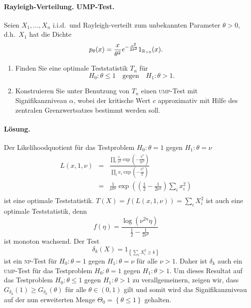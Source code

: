 






\paragraph{Rayleigh-Verteilung. UMP-Test.} Seien $X_1,\ldots,X_n$ i.i.d.\ und Rayleigh-verteilt
zum unbekannten Parameter $\theta>0$, d.h.\ $X_1$ hat die Dichte 
\begin{equation*}
    p_\theta(x) = \frac{x}{\theta^2} e^{- \frac{x^2}{2\theta^2}} 1_{\mathbb R_{>0}}(x).
\end{equation*}
\begin{enumerate}
    \item Finden Sie eine optimale Teststatistik $T_n$ für
        \begin{equation*}
            H_0 : \theta\leq 1 \quad \textrm{gegen} \quad H_1 : \theta >1.
        \end{equation*}
    \item Konstruieren Sie unter Benutzung von $T_n$ einen \textsc{ump}-Test mit Signifikanzniveau 
        $\alpha$, wobei der kritische Wert $c$ approximativ mit Hilfe des zentralen Grenzwertsatzes
        bestimmt werden soll.
\end{enumerate}

\paragraph*{Lösung. } Der Likelihoodquotient für das Testproblem $H_0: \theta=1$ gegen $H_1 : \theta=\nu$
\begin{eqnarray*}
    L(x,1,\nu) &=& 
    \frac{\prod_i \frac{x_i}{\nu^2} \exp \left( -\frac{x_i^2}{2 \nu^2} \right)}{ \prod_i x_i \exp \left( - \frac{x_i^2}{2} \right)  } \\
    &=& \frac{1}{ \nu^{2n}} \exp\left( \left( \frac{1}{2} -\frac{1}{2 \nu^2} \right) \sum_{i}^{} x_i^2 \right)\\
\end{eqnarray*}
ist eine optimale Teststatistik. $T(X)=f(L(x,1,\nu))= \sum_{i}^{} X_i^2$ 
ist auch eine optimale Teststatistik, denn
\begin{equation*}
    f(\eta) = \frac{ \log \left( \nu^{2n} \eta \right) }{\frac{1}{2} - \frac{1}{2\nu^2}}
\end{equation*}
ist monoton wachsend. Der Test
\begin{equation*}
    \delta_k(X) = 1_{  \left\{ \sum_{i}^{}X_i^2 \geq k \right\} }
\end{equation*}
ist ein \textsc{np}-Test für $H_0: \theta=1$ gegen $H_1 : \theta= \nu$ für alle $\nu>1$.
Daher ist $\delta_k$ auch ein \textsc{ump}-Test für das Testproblem $H_0: \theta=1$ gegen $H_1 : \theta>1$.
Um dieses Resultat auf das Testproblem $H_0: \theta \leq 1$ gegen $H_1 : \theta>1$ zu verallgemeinern, zeigen
wir, dass $G_{\delta_k}(1)\geq G_{\delta_k} (\theta)$ für alle $\theta \in (0,1)$ gilt und somit wird das
Signifikanzniveau auf der nun erweiterten Menge $\Theta_0 = \left\{ \theta\leq 1 \right\}$ gehalten.

